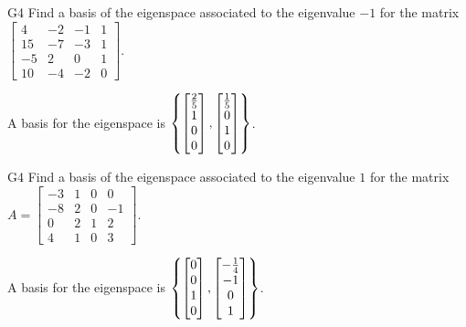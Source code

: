 \begin{problem}{G4}
Find a basis of the eigenspace associated to the eigenvalue \(-1\) for the matrix 
\(\begin{bmatrix} 4 & -2 & -1 & 1 \\ 15 & -7 & -3 & 1 \\ -5 & 2 & 0 & 1 \\ 10 & -4 & -2 & 0 \end{bmatrix}\). 
\end{problem}
\begin{solution}
A basis for the eigenspace is  \(\left\{\begin{bmatrix} \frac{2}{5} \\1 \\  0\\0 \end{bmatrix},\begin{bmatrix} \frac{1}{5} \\ 0 \\ 1\\0 \end{bmatrix}\right\}\).
\end{solution}

\begin{problem}{G4}
Find a basis of the eigenspace associated to the eigenvalue \(1\) for the matrix 
\(A=\begin{bmatrix} -3 & 1 & 0 & 0 \\ -8 & 2 & 0 & -1 \\ 0 & 2 & 1 & 2 \\ 4 & 1 & 0 & 3 \end{bmatrix}\).
\end{problem}
\begin{solution}
A basis for the eigenspace is  $\left\{\begin{bmatrix}0\\0\\1\\0\end{bmatrix},\begin{bmatrix} -\frac{1}{4} \\ -1 \\ 0\\1 \end{bmatrix}\right\}$.
\end{solution}

